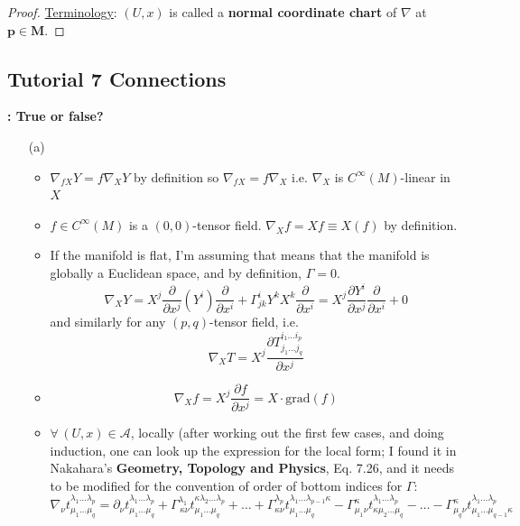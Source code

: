\documentclass[10pt]{amsart}
\newcommand{\exercisehead}[1]
  { \smallskip
   \noindent{\small\bf Exercise #1.}
  }
\begin{document}
\begin{multicols*}{2}
\begin{proof}
\underline{Terminology}: $(U,x)$ is called a \textbf{normal coordinate chart} of $\nabla$ at {$\mathbf{p\in M}$}.

\end{proof}


	
	\subsection*{Tutorial 7 Connections}
	
	\exercisehead{1}\textbf{: True or false?}
	
	\begin{enumerate}
		\item[(a)] 
		\begin{itemize}
			\item $\nabla_{fX}Y = f\nabla_XY$ by definition so $\nabla_{fX} = f\nabla_X$ i.e. $\nabla_X$ is $C^{\infty}(M)$-linear in $X$
			\item $f\in C^{\infty}(M)$ is a $(0,0)$-tensor field. $\nabla_Xf = Xf \equiv X(f)$ by definition.
			\item If the manifold is flat, I'm assuming that means that the manifold is globally a Euclidean space, and by definition, $\Gamma=0$.
			\[
			\nabla_X Y = X^j \frac{ \partial }{ \partial x^j} (Y^i) \frac{ \partial }{ \partial x^i } + \Gamma^i_{jk} Y^k X^k \frac{ \partial }{ \partial x^i} = X^j \frac{ \partial Y^i}{ \partial x^j} \frac{ \partial }{ \partial x^i} + 0
			\]
			and similarly for any $(p,q)$-tensor field, i.e.
			\[
			\nabla_X T = X^j \frac{ \partial T^{i_1 \dots i_p}_{ j_1 \dots j_q} }{ \partial x^j}
			\]
			\item \[
			\nabla_X f = X^j \frac{ \partial f}{ \partial x^j} = X\cdot \text{grad}(f)
			\]
			\item $\forall \, (U,x) \in \mathcal{A}$, locally (after working out the first few cases, and doing induction, one can look up the expression for the local form; I found it in Nakahara's \textbf{Geometry, Topology and Physics}, Eq. 7.26, and it needs to be modified for the convention of order of bottom indices for $\Gamma$:
			\[
			\nabla_{\nu} t^{\lambda_1 \dots \lambda_p }_{ \mu_1 \dots \mu_q} = \partial_{\nu} t^{\lambda_1 \dots \lambda_p}_{ \mu_1 \dots \mu_q} + \Gamma^{\lambda_1}_{ \,  \kappa \nu } t^{\kappa \lambda_2 \dots \lambda_p }_{\mu_1 \dots \mu_q} + \dots + \Gamma^{\lambda_p}_{ \kappa \nu } t^{\lambda_1 \dots \lambda_{p-1} \kappa }_{ \mu_1 \dots \mu_q} - \Gamma^{\kappa}_{  \mu_1 \nu} t^{\lambda_1 \dots \lambda_p }_{ \kappa \mu_2 \dots \mu_q} - \dots - \Gamma^{\kappa}_{  \mu_q \nu} t^{\lambda_1 \dots \lambda_p }_{\mu_1 \dots \mu_{q-1} \kappa }
\]
\end{itemize}
\end{enumerate}
\end{multicols*}
\end{document}
